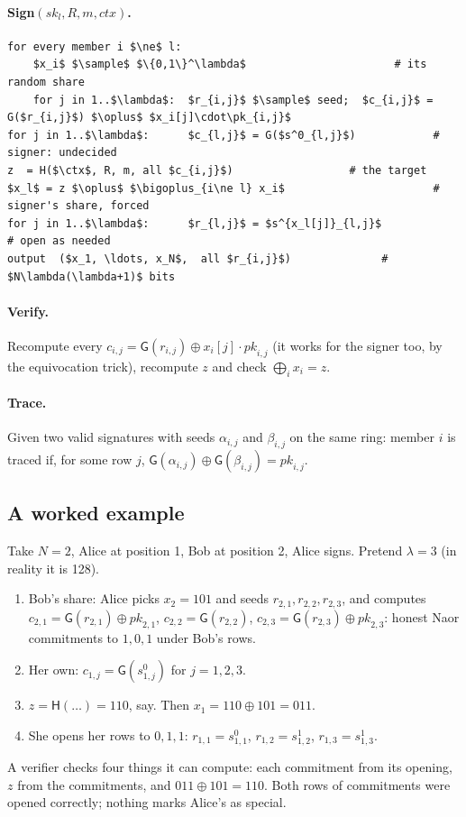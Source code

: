 \documentclass[11pt,a4paper]{article}
\newcommand{\sk}{\mathit{sk}}
\newcommand{\pk}{\mathit{pk}}
\newcommand{\Gf}{\mathsf{G}}
\newcommand{\Hf}{\mathsf{H}}
\newcommand{\ctx}{\mathit{ctx}}
\newcommand{\sample}{\xleftarrow{\$}}
\newcommand{\Sign}{\textsf{Sign}}
\newcommand{\Verify}{\textsf{Verify}}
\newcommand{\Trace}{\textsf{Trace}}
\theoremstyle{definition}
\begin{document}
\paragraph{\Sign$(\sk_l, R, m, \ctx)$.}
\begin{lstlisting}[style=pseudo]
for every member i $\ne$ l:
    $x_i$ $\sample$ $\{0,1\}^\lambda$                       # its random share
    for j in 1..$\lambda$:  $r_{i,j}$ $\sample$ seed;  $c_{i,j}$ = G($r_{i,j}$) $\oplus$ $x_i[j]\cdot\pk_{i,j}$
for j in 1..$\lambda$:      $c_{l,j}$ = G($s^0_{l,j}$)            # signer: undecided
z  = H($\ctx$, R, m, all $c_{i,j}$)                  # the target
$x_l$ = z $\oplus$ $\bigoplus_{i\ne l} x_i$                       # signer's share, forced
for j in 1..$\lambda$:      $r_{l,j}$ = $s^{x_l[j]}_{l,j}$             # open as needed
output  ($x_1, \ldots, x_N$,  all $r_{i,j}$)              # $N\lambda(\lambda+1)$ bits
\end{lstlisting}

\paragraph{\Verify.} Recompute every $c_{i,j} = \Gf(r_{i,j}) \oplus
x_i[j]\cdot\pk_{i,j}$ (it works for the signer too, by the equivocation
trick), recompute $z$ and check $\bigoplus_i x_i = z$.

\paragraph{\Trace.} Given two valid signatures with seeds $\alpha_{i,j}$
and $\beta_{i,j}$ on the same ring: member $i$ is traced if, for some row
$j$, $\Gf(\alpha_{i,j}) \oplus \Gf(\beta_{i,j}) = \pk_{i,j}$.

\subsection{A worked example}

Take $N = 2$, Alice at position 1, Bob at position 2, Alice signs. Pretend
$\lambda = 3$ (in reality it is 128).
\begin{enumerate}[leftmargin=*]
\item Bob's share: Alice picks $x_2 = 101$ and seeds $r_{2,1}, r_{2,2},
      r_{2,3}$, and computes $c_{2,1} = \Gf(r_{2,1}) \oplus \pk_{2,1}$,
      $c_{2,2} = \Gf(r_{2,2})$, $c_{2,3} = \Gf(r_{2,3}) \oplus \pk_{2,3}$:
      honest Naor commitments to $1, 0, 1$ under Bob's rows.
\item Her own: $c_{1,j} = \Gf(s^0_{1,j})$ for $j = 1, 2, 3$.
\item $z = \Hf(\ldots) = 110$, say. Then $x_1 = 110 \oplus 101 = 011$.
\item She opens her rows to $0, 1, 1$: $r_{1,1} = s^0_{1,1}$, $r_{1,2} =
      s^1_{1,2}$, $r_{1,3} = s^1_{1,3}$.
\end{enumerate}
A verifier checks four things it can compute: each commitment from its
opening, $z$ from the commitments, and $011 \oplus 101 = 110$. Both rows
of commitments were opened correctly; nothing marks Alice's as special.
\end{document}
